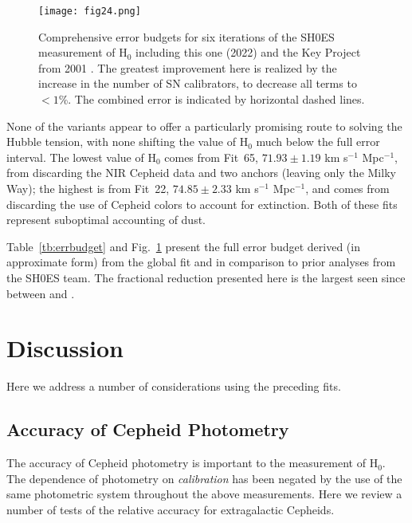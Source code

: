 \documentclass[12pt]{aastex631}
\newcommand{\hlow}{$ 71.93 \pm  1.19  $ km s$^{-1}$ Mpc$^{-1}$}
\newcommand{\hhigh}{$ 74.85 \pm  2.33  $ km s$^{-1}$ Mpc$^{-1}$}
\begin{document}
\clearpage

\begin{figure}[t]  
\texttt{[image: fig24.png]}
\caption{\label{fg:errbudget} Comprehensive error budgets for six iterations of the SH0ES measurement of H$_0$ including this one (2022) and the Key Project from 2001 \citep{freedman01}.  The greatest improvement here is realized by the increase in the number of SN calibrators, to decrease all terms to $<1$\%.  The combined error is indicated by horizontal dashed lines.}
\vspace{0.5in}
\end{figure}

\clearpage

None of the variants appear to offer a particularly promising route to solving the Hubble tension, with none shifting the value of H$_0$ much below the full error interval. The lowest value of H$_0$ comes from Fit~65, \hlow, from discarding the NIR Cepheid data and two anchors (leaving only the Milky Way); the highest is from Fit~22, \hhigh, and comes from discarding the use of Cepheid colors to account for extinction.  Both of these fits represent suboptimal accounting of dust.
  
Table~\ref{tb:errbudget} and Fig.~\ref{fg:errbudget} present the full error budget derived (in approximate form) from the global fit and in comparison to prior analyses from the SH0ES team.  The fractional reduction presented here is the largest seen since between \citet{riess11} and \citet{Riess:2016}.

\section{Discussion\label{sc:7}}
     
Here we address a number of considerations using the preceding fits.
    
\subsection{Accuracy of Cepheid Photometry\label{sc:7.1}}

The accuracy of Cepheid photometry is important to the measurement of H$_0$.  The dependence of photometry on {\it calibration} has been negated by the use of the same photometric system throughout the above measurements.  Here we review a number of tests of the relative accuracy for extragalactic Cepheids.
\end{document}
